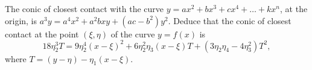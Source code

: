 The conic of closest contact with the curve $y = ax^{2} + bx^{3} + cx^{4} + \dots + kx^{n}$,
at the origin, is $a^{3}y = a^{4}x^{2} + a^{2}bxy + (ac - b^{2})y^{2}$. Deduce that the conic of
closest contact at the point $(\xi, \eta)$ of the curve $y = f(x)$ is
\[
18\eta_{2}^{3}T
  = 9\eta_{2}^{4}(x - \xi)^{2}
  + 6\eta_{2}^{2}\eta_{3}(x - \xi)T
  + (3\eta_{2}\eta_{4} - 4\eta_{3}^{2})T^{2},
\]
where $T = (y - \eta) - \eta_{1}(x - \xi)$.

